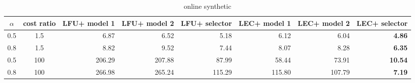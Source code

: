 \begin{table}[ht]
\begin{center}
\begin{tabular}{ ccp{3.2em}p{3.2em}p{3.2em}p{3.2em}p{3.2em}p{3.2em} }
  \toprule
  $\alpha$ & cost ratio &  LFU+ model 1 & LFU+ model 2 & LFU+ selector & LEC+ model 1 & LEC+ model 2 & LEC+ selector \\ 
  \midrule
  0.5 & 1.5 & \multicolumn{1}{r}{ 6.87 } & \multicolumn{1}{r}{ 6.52 } & \multicolumn{1}{r}{ 5.18 } & \multicolumn{1}{r}{ 6.12 } & \multicolumn{1}{r}{ 6.04 } & \multicolumn{1}{r}{ \textbf{ 4.86 } } \\ 
  0.8 & 1.5 & \multicolumn{1}{r}{ 8.82 } & \multicolumn{1}{r}{ 9.52 } & \multicolumn{1}{r}{ 7.44 } & \multicolumn{1}{r}{ 8.07 } & \multicolumn{1}{r}{ 8.28 } & \multicolumn{1}{r}{ \textbf{ 6.35 } } \\ 
  0.5 & 100 & \multicolumn{1}{r}{ 206.29 } & \multicolumn{1}{r}{ 207.88 } & \multicolumn{1}{r}{ 87.99 } & \multicolumn{1}{r}{ 58.44 } & \multicolumn{1}{r}{ 73.91 } & \multicolumn{1}{r}{ \textbf{ 10.54 } } \\ 
  0.8 & 100 & \multicolumn{1}{r}{ 266.98 } & \multicolumn{1}{r}{ 265.24 } & \multicolumn{1}{r}{ 115.29 } & \multicolumn{1}{r}{ 115.80 } & \multicolumn{1}{r}{ 107.79 } & \multicolumn{1}{r}{ \textbf{ 7.19 } } \\ 
  \bottomrule
\end{tabular}
\end{center}
\caption{online synthetic}
\label{tab:online_synthetic}
\end{table}
